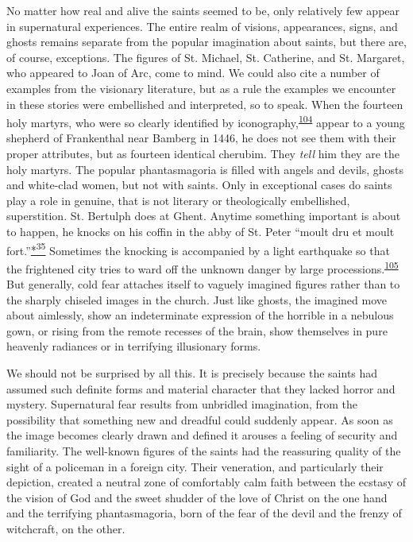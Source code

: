 No matter how real and alive the saints seemed to be, only relatively
few appear in supernatural experiences. The entire realm of visions,
appearances, signs, and ghosts remains separate from the popular
imagination about saints, but there are, of course, exceptions. The
figures of St. Michael, St. Catherine, and St. Margaret, who appeared to
Joan of Arc, come to mind. We could also cite a number of examples from
the visionary literature, but as a rule the examples we encounter in
these stories were embellished and interpreted, so to speak. When the
fourteen holy martyrs, who were so clearly identified by
iconography,\textsuperscript{\protect\hypertarget{13_Chapter_Six__THE_DEPICTION_OF_TH.xhtmlux5cux23id_1064}{\protect\hyperlink{23_NOTES.xhtmlux5cux23id_1065}{104}}}
appear to a young shepherd of Frankenthal near Bamberg in 1446, he does
not see
\protect\hypertarget{13_Chapter_Six__THE_DEPICTION_OF_TH.xhtmlux5cux23page_193}{}{}them
with their proper attributes, but as fourteen identical cherubim. They
\emph{tell} him they are the holy martyrs. The popular phantasmagoria is
filled with angels and devils, ghosts and white-clad women, but not with
saints. Only in exceptional cases do saints play a role in genuine, that
is not literary or theologically embellished, superstition. St. Bertulph
does at Ghent. Anytime something important is about to happen, he knocks
on his coffin in the abby of St. Peter ``moult dru et moult
fort.''\protect\hypertarget{13_Chapter_Six__THE_DEPICTION_OF_TH.xhtmlux5cux23id_3057}{\protect\hyperlink{23_NOTES.xhtmlux5cux23id_3058}{*\textsuperscript{35}}}
Sometimes the knocking is accompanied by a light earthquake so that the
frightened city tries to ward off the unknown danger by large
processions.\textsuperscript{\protect\hypertarget{13_Chapter_Six__THE_DEPICTION_OF_TH.xhtmlux5cux23id_1062}{\protect\hyperlink{23_NOTES.xhtmlux5cux23id_1063}{105}}}
But generally, cold fear attaches itself to vaguely imagined figures
rather than to the sharply chiseled images in the church. Just like
ghosts, the imagined move about aimlessly, show an indeterminate
expression of the horrible in a nebulous gown, or rising from the remote
recesses of the brain, show themselves in pure heavenly radiances or in
terrifying illusionary forms.

We should not be surprised by all this. It is precisely because the
saints had assumed such definite forms and material character that they
lacked horror and mystery. Supernatural fear results from unbridled
imagination, from the possibility that something new and dreadful could
suddenly appear. As soon as the image becomes clearly drawn and defined
it arouses a feeling of security and familiarity. The well-known figures
of the saints had the reassuring quality of the sight of a policeman in
a foreign city. Their veneration, and particularly their depiction,
created a neutral zone of comfortably calm faith between the ecstasy of
the vision of God and the sweet shudder of the love of Christ on the one
hand and the terrifying phantasmagoria, born of the fear of the devil
and the frenzy of witchcraft, on the other.

